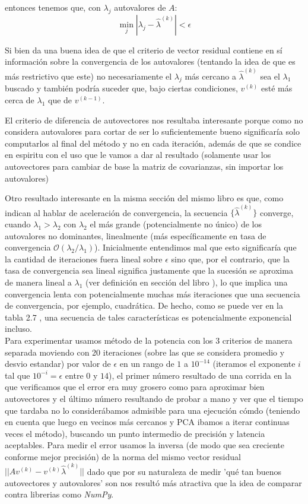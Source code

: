 entonces tenemos que, con $\lambda_j$ autovalores de $A$:
\begin{equation}
 \min_{j}|\lambda_j - \hat{\lambda}^{(k)}| < \epsilon
\end{equation}

Si bien da una buena idea de que el criterio de vector residual contiene en sí información sobre la convergencia de los autovalores (tentando la idea de que es más restrictivo que este) no necesariamente el $\lambda_j$ más cercano a $\hat{\lambda}^{(k)}$ sea el $\lambda_1$ buscado y también podría suceder que, bajo ciertas condiciones, $v^{(k)}$ esté más cerca de $\lambda_1$ que de $v^{(k-1)}$.

El criterio de diferencia de autovectores nos resultaba interesante porque como no considera autovalores para cortar de ser lo suficientemente bueno significaría solo computarlos al final del método y no en cada iteración, además de que se condice en espiritu con el uso que le vamos a dar al resultado (solamente usar los autovectores para cambiar de base la matriz de covarianzas, sin importar los autovalores)

Otro resultado interesante en la misma sección del mismo libro es que, como indican al hablar de aceleración de convergencia, la secuencia $\{\hat{\lambda}^{(k)}\}$ converge, cuando $\lambda_1 > \lambda_2 $ con $\lambda_2$ el más grande (potencialmente no único) de los autovalores no dominantes, linealmente (más específicamente en tasa de convergencia $\mathcal{O}(\lambda_2/\lambda_1)$).
Inicialmente entendimos mal que esto significaría que la cantidad de iteraciones fuera lineal sobre $\epsilon$ sino que, por el contrario, que la tasa de convergencia sea lineal significa justamente que la sucesión se aproxima de manera lineal a $\lambda_1$ (ver definición en sección del libro \cite{Burden}), lo que implica una convergencia lenta con potencialmente muchas más iteraciones que una secuencia de convergencia, por ejemplo, cuadrática. De hecho, como se puede ver en la tabla 2.7 \cite{Burden}, una secuencia de tales características es potencialmente exponencial incluso.\\

Para experimentar usamos método de la potencia con los 3 criterios de manera separada moviendo con 20 iteraciones (sobre las que se considera promedio y desvio estandar) por valor de $\epsilon$ en un rango de $1$ a $10^{-14}$ (iteramos el exponente $i$ tal que $10^{-i}=\epsilon$ entre $0$ y $14$), el primer número resultado de una corrida en la que verificamos que el error era muy grosero como para aproximar bien autovectores y el último número resultando de probar a mano y ver que el tiempo que tardaba no lo considerábamos admisible para una ejecución cómdo (teniendo en cuenta que luego en vecinos más cercanos y PCA ibamos a iterar continuas veces el método), buscando un punto intermedio de precisión y latencia aceptables. Para medir el error usamos la inversa (de modo que sea creciente conforme mejor precisión) de la norma del mismo vector residual $|| A v^{(k)} - v^{(k)}\hat{\lambda}^{(k)} ||$ dado que por su naturaleza de medir 'qué tan buenos autovectores y autovalores' son nos resultó más atractiva que la idea de comparar contra librerias como \textit{NumPy}.

